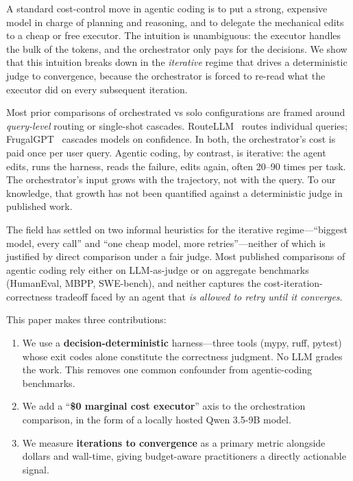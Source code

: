 \documentclass[11pt,a4paper]{article}
\begin{document}
A standard cost-control move in agentic coding is to put a strong, expensive model in charge of planning and reasoning, and to delegate the mechanical edits to a cheap or free executor. The intuition is unambiguous: the executor handles the bulk of the tokens, and the orchestrator only pays for the decisions. We show that this intuition breaks down in the \emph{iterative} regime that drives a deterministic judge to convergence, because the orchestrator is forced to re-read what the executor did on every subsequent iteration.

Most prior comparisons of orchestrated vs solo configurations are framed around \emph{query-level} routing or single-shot cascades. RouteLLM~\citep{ong2024routellm} routes individual queries; FrugalGPT~\citep{chen2023frugalgpt} cascades models on confidence. In both, the orchestrator's cost is paid once per user query. Agentic coding, by contrast, is iterative: the agent edits, runs the harness, reads the failure, edits again, often 20--90 times per task. The orchestrator's input grows with the trajectory, not with the query. To our knowledge, that growth has not been quantified against a deterministic judge in published work.

The field has settled on two informal heuristics for the iterative regime---``biggest model, every call'' and ``one cheap model, more retries''---neither of which is justified by direct comparison under a fair judge. Most published comparisons of agentic coding rely either on LLM-as-judge or on aggregate benchmarks (HumanEval, MBPP, SWE-bench), and neither captures the cost-iteration-correctness tradeoff faced by an agent that \emph{is allowed to retry until it converges}.

This paper makes three contributions:
\begin{enumerate}
    \item We use a \textbf{decision-deterministic} harness---three tools (mypy, ruff, pytest) whose exit codes alone constitute the correctness judgment. No LLM grades the work. This removes one common confounder from agentic-coding benchmarks.
    \item We add a ``\textbf{\$0 marginal cost executor}'' axis to the orchestration comparison, in the form of a locally hosted Qwen 3.5-9B model.
    \item We measure \textbf{iterations to convergence} as a primary metric alongside dollars and wall-time, giving budget-aware practitioners a directly actionable signal.
\end{enumerate}
\end{document}
